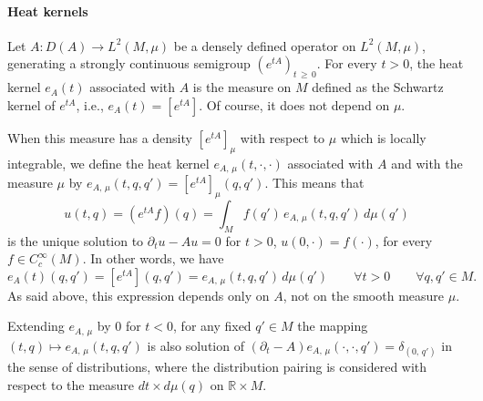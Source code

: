\documentclass[10pt]{amsart}
\theoremstyle{definition}\newtheorem{defi}[theo]{Definition}\newtheorem{rema}[theo]{Remark}\newtheorem{exam}[theo]{Example}\newtheorem{exem}[theo]{Example}\newtheorem{nota}[theo]{Notation}
\newcommand*\R{\mathbb{R}}
\renewcommand{\geq}{\geqslant}
\let\oldforall\forall
\renewcommand*{\forall}{\mathrel{\oldforall}}
\begin{document}
\goodbreak
\paragraph{Heat kernels}
Let $A:D(A)\rightarrow L^2(M,\mu)$ be a densely defined operator on $L^2(M,\mu)$, generating a strongly continuous semigroup $(e^{tA})_{t\,\geq\,0}$. For every $t>0$, the heat kernel $e_A(t)$ associated with $A$ is the measure on $M$ defined as the Schwartz kernel of $e^{tA}$, i.e., $e_A(t)=[e^{tA}]$. Of course, it does not depend on $\mu$.


When this measure has a density $[e^{tA}]_\mu$ with respect to $\mu$ which is locally integrable, we define the heat kernel $e_{A,\,\mu}(t,\cdot,\cdot)$ associated with $A$ and with the measure $\mu$ by $e_{A,\,\mu}(t,q,q') = [e^{tA}]_\mu(q,q')$. This means that
\[
u(t,q) = \left(e^{tA}f\right)(q) = \int_M f(q')\, e_{A,\,\mu}(t,q,q')\, d\mu(q')
\]
is the unique solution to $\partial_t u-Au=0$ for $t>0$, $u(0,\cdot)=f(\cdot)$, for every $f\in C_c^\infty(M)$. In other words, we have
\[
e_A(t)(q,q') = \left[e^{tA}\right](q,q') = e_{A,\,\mu}(t,q,q')\, d\mu(q') \qquad\forall t>0\qquad \forall q,q'\in M.
\]
As said above, this expression depends only on $A$, not on the smooth measure $\mu$.


Extending $e_{A,\,\mu}$ by $0$ for $t<0$, for any fixed $q'\in M$ the mapping $(t,q)\mapsto e_{A,\,\mu}(t,q,q')$ is also solution of $(\partial_t-A)e_{A,\,\mu}(\cdot,\cdot,q')=\delta_{(0,\,q')}$ in the sense of distributions, where the distribution pairing is considered with respect to the measure $dt\times d\mu(q)$ on $\R\times M$.
\end{document}
